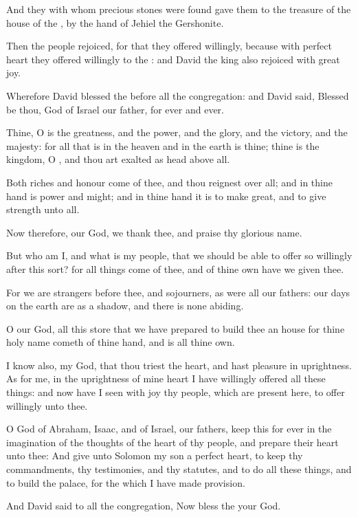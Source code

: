 \Verse And they with whom precious stones were found gave them to the treasure of the house of the \LORD, by the hand of Jehiel the Gershonite.

\Verse Then the people rejoiced, for that they offered willingly, because with perfect heart they offered willingly to the \LORD: and David the king also rejoiced with great joy.

\Verse Wherefore David blessed the \LORD before all the congregation: and David said, Blessed be thou, \LORD God of Israel our father, for ever and ever.

\Verse Thine, O \LORD is the greatness, and the power, and the glory, and the victory, and the majesty: for all that is in the heaven and in the earth is thine; thine is the kingdom, O \LORD, and thou art exalted as head above all.

\Verse Both riches and honour come of thee, and thou reignest over all; and in thine hand is power and might; and in thine hand it is to make great, and to give strength unto all.

\Verse Now therefore, our God, we thank thee, and praise thy glorious name.

\Verse But who am I, and what is my people, that we should be able to offer so willingly after this sort? for all things come of thee, and of thine own have we given thee.

\Verse For we are strangers before thee, and sojourners, as were all our fathers: our days on the earth are as a shadow, and there is none abiding.

\Verse O \LORD our God, all this store that we have prepared to build thee an house for thine holy name cometh of thine hand, and is all thine own.

\Verse I know also, my God, that thou triest the heart, and hast pleasure in uprightness. As for me, in the uprightness of mine heart I have willingly offered all these things: and now have I seen with joy thy people, which are present here, to offer willingly unto thee.

\Verse O \LORD God of Abraham, Isaac, and of Israel, our fathers, keep this for ever in the imagination of the thoughts of the heart of thy people, and prepare their heart unto thee: \Verse And give unto Solomon my son a perfect heart, to keep thy commandments, thy testimonies, and thy statutes, and to do all these things, and to build the palace, for the which I have made provision.

\Verse And David said to all the congregation, Now bless the \LORD your God.

